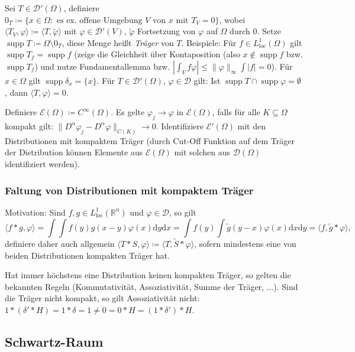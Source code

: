 \documentclass[11pt,a4paper]{scrartcl}
\newcommand{\R}{\mathbb{R}} %
\newcommand{\D}{\mathcal{D}}
\newcommand{\E}{\mathcal{E}}
\theoremstyle{plain}
\theoremstyle{definition}
\theoremstyle{remark}
\DeclareMathOperator{\supp}{supp}
\DeclareMathOperator{\loc}{loc}
\begin{document}
Sei $T\in \D'(\Omega)$, definiere $0_T\coloneqq \{ x\in\Omega: \text{ es ex. offene Umgebung } V \text{ von } x \text{ mit } T_V = 0 \}$, wobei $\langle T_V, \varphi \rangle \coloneqq \langle T, \tilde\varphi \rangle$ mit $\varphi\in \D'(V)$, $\tilde\varphi$ Fortsetzung von $\varphi$ auf $\Omega$ durch $0$. Setze $\supp T\coloneqq \Omega \setminus 0_T$, diese Menge heißt \emph{Träger} von $T$. Beispiele: Für $f\in L^1_{\loc}(\Omega)$ gilt $\supp T_f = \supp f$ (zeige die Gleichheit über Kontaposition (also $x\not \in \supp f$ bzw. $\supp T_f$) und nutze Fundamentallemma bzw. $|\int_V f\varphi|\leq \|\varphi\|_\infty \int |f| = 0$). Für $x\in\Omega$ gilt $\supp \delta_x = \{ x \}$. Für $T\in \D'(\Omega)$, $\varphi \in \D$ gilt: Ist $\supp T \cap \supp \varphi = \emptyset$, dann $\langle T, \varphi \rangle = 0$.

Definiere $\E(\Omega) \coloneqq C^\infty(\Omega)$. Es gelte $\varphi_j \to \varphi$ in $\E(\Omega)$, falls für alle $K\subseteq \Omega$ kompakt gilt: $\|D^\alpha \varphi_j - D^\alpha \varphi \|_{C(K)} \to 0$.  Identifiziere $\E'(\Omega)$ mit den Distributionen mit kompaktem Träger (durch Cut-Off Funktion auf dem Träger der Distribution können Elemente aus $\E(\Omega)$ mit solchen aus $\D(\Omega)$ identifiziert werden).

\subsubsection{Faltung von Distributionen mit kompaktem Träger}

Motivation: Sind $f,g\in L^1_\mathrm{loc}(\R^n)$ und $\varphi\in \D$, so gilt $$\langle f\ast g, \varphi \rangle = \int \int f(y) g(x-y) \varphi(x) \mathrm{d}y \mathrm{d}x = \int f(y) \int \tilde g(y-x) \varphi(x) \mathrm{d}x \mathrm{d}y = \langle f, \tilde g \ast \varphi \rangle,$$ definiere daher auch allgemein $\langle T\ast S, \varphi \rangle \coloneqq \langle T, \tilde S \ast \varphi \rangle$, sofern mindestens eine von beiden Distributionen kompakten Träger hat.

Hat immer höchstens eine Distribution keinen kompakten Träger, so gelten die bekannten Regeln (Kommutativität, Assoziativität, Summe der Träger, ...).  Sind die Träger nicht kompakt, so gilt Assoziativität nicht: $1*(\delta'*H)=1*\delta=1\neq 0=0*H=(1*\delta')*H$.

\subsection{Schwartz-Raum}
\end{document}
